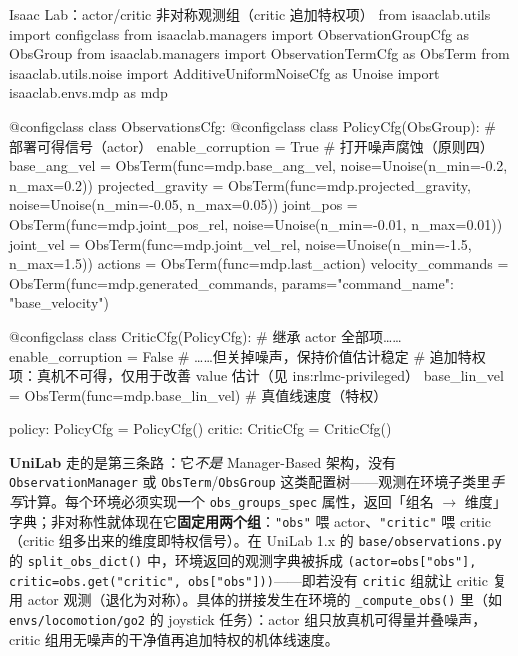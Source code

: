 \begin{codebox}[Python]{Isaac Lab：actor/critic 非对称观测组（critic 追加特权项）}
from isaaclab.utils import configclass
from isaaclab.managers import ObservationGroupCfg as ObsGroup
from isaaclab.managers import ObservationTermCfg as ObsTerm
from isaaclab.utils.noise import AdditiveUniformNoiseCfg as Unoise
import isaaclab.envs.mdp as mdp

@configclass
class ObservationsCfg:
    @configclass
    class PolicyCfg(ObsGroup):           # 部署可得信号（actor）
        enable_corruption = True          # 打开噪声腐蚀（原则四）
        base_ang_vel = ObsTerm(func=mdp.base_ang_vel,
                               noise=Unoise(n_min=-0.2, n_max=0.2))
        projected_gravity = ObsTerm(func=mdp.projected_gravity,
                                    noise=Unoise(n_min=-0.05, n_max=0.05))
        joint_pos = ObsTerm(func=mdp.joint_pos_rel,
                            noise=Unoise(n_min=-0.01, n_max=0.01))
        joint_vel = ObsTerm(func=mdp.joint_vel_rel,
                            noise=Unoise(n_min=-1.5, n_max=1.5))
        actions = ObsTerm(func=mdp.last_action)
        velocity_commands = ObsTerm(func=mdp.generated_commands,
                                    params={"command_name": "base_velocity"})

    @configclass
    class CriticCfg(PolicyCfg):           # 继承 actor 全部项……
        enable_corruption = False         # ……但关掉噪声，保持价值估计稳定
        # 追加特权项：真机不可得，仅用于改善 value 估计（见 ins:rlmc-privileged）
        base_lin_vel = ObsTerm(func=mdp.base_lin_vel)   # 真值线速度（特权）

    policy: PolicyCfg = PolicyCfg()
    critic: CriticCfg = CriticCfg()
\end{codebox}

\textbf{UniLab} 走的是第三条路\,\cite{unilab2026}：它\emph{不是} Manager-Based 架构，没有 \verb|ObservationManager| 或 \verb|ObsTerm|/\verb|ObsGroup| 这类配置树——观测在环境子类里\emph{手写}计算。每个环境必须实现一个 \verb|obs_groups_spec| 属性，返回「组名 $\to$ 维度」字典；非对称性就体现在它\textbf{固定用两个组}：\verb|"obs"| 喂 actor、\verb|"critic"| 喂 critic（critic 组多出来的维度即特权信号）。在 UniLab 1.x 的 \verb|base/observations.py| 的 \verb|split_obs_dict()| 中，环境返回的观测字典被拆成 \verb|(actor=obs["obs"], critic=obs.get("critic", obs["obs"]))|——即若没有 \verb|critic| 组就让 critic 复用 actor 观测（退化为对称）。具体的拼接发生在环境的 \verb|_compute_obs()| 里（如 \verb|envs/locomotion/go2| 的 joystick 任务）：actor 组只放真机可得量并叠噪声，critic 组用无噪声的干净值再追加特权的机体线速度。

